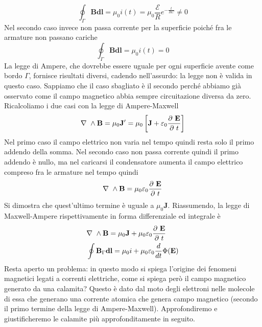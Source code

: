 \documentclass[
10pt, %
a4paper, %
oneside, %
headinclude,footinclude, %
BCOR5mm, %
]{scrartcl}
\begin{document}
\[\oint_{\Gamma}\mathbf{B}\mathbf{dl}=\mu_0 i(t)= \mu_0 \frac{\mathcal{E}}{R}e^{-\frac{t}{RC}}\neq0\]
Nel secondo caso invece non passa corrente per la superficie poiché fra le armature non passano cariche
\[\oint_{\Gamma}\mathbf{B}\mathbf{dl}=\mu_0 i(t)= 0\]
La legge di Ampere, che dovrebbe essere uguale per ogni superficie avente come bordo $\Gamma$, fornisce risultati diversi, cadendo nell'assurdo: la legge non è valida in questo caso. Sappiamo che il caso sbagliato è il secondo perché abbiamo già osservato come il campo magnetico abbia sempre circuitazione diversa da zero.\\
Ricalcoliamo i due casi con la legge di Ampere-Maxwell
\[\mathbf{\nabla\ }\wedge\mathbf{B}=\mu_0\mathbf{J'}=\mu_0\left[\mathbf{J}+\varepsilon_0\frac{\partial\  \mathbf{E}}{\partial\  t}\right]\]
Nel primo caso il campo elettrico non varia nel tempo quindi resta solo il primo addendo della somma. Nel secondo caso non passa corrente quindi il primo addendo è nullo, ma nel caricarsi il condensatore aumenta il campo elettrico compreso fra le armature nel tempo quindi 
\[\mathbf{\nabla\ }\wedge\mathbf{B}=\mu_0\varepsilon_0\frac{\partial\  \mathbf{E}}{\partial\  t}\]
Si dimostra che quest'ultimo termine è uguale a \(\mu_0\mathbf{J}\).
Riassumendo, la legge di Maxwell-Ampere rispettivamente in forma differenziale ed integrale è
\begin{align}\label{eq:legge_Maxwell_Ampere}
	&\mathbf{\nabla\ }\wedge\mathbf{B}=\mu_0\mathbf{J}+\mu_0\varepsilon_0\frac{\partial\ \mathbf{E}}{\partial\  t}\\
	&\oint\mathbf{B}_{\Gamma}\mathbf{dl}= \mu_0 i + \mu_0\varepsilon_0\frac{d}{dt}\Phi(\mathbf{E})
\end{align}
Resta aperto un problema: in questo modo si spiega l'origine dei fenomeni magnetici legati a correnti elettriche, come si spiega però il campo magnetico generato da una calamita? Questo è dato dal moto degli elettroni nelle molecole di essa che generano una corrente atomica che genera campo magnetico (secondo il primo termine della legge di Ampere-Maxwell). Approfondiremo e giustificheremo le calamite più approfonditamente in seguito.
\end{document}
